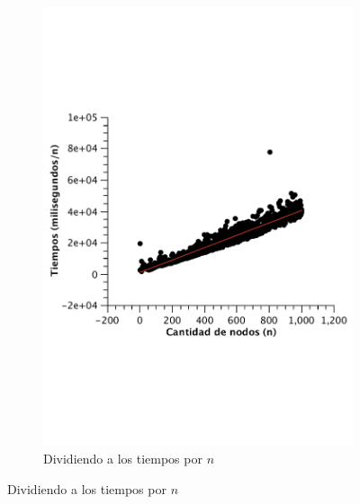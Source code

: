 \begin{figure}[H]
        \begin{subfigure}[b]{0.25\textwidth}
                \includegraphics[width=\textwidth]{imagenes/vacio-matriz-2.pdf}
                \caption{Dividiendo a los tiempos por $n$}
        \end{subfigure}


\end{figure}
